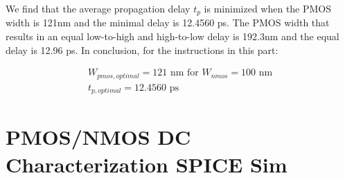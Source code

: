 \documentclass[11pt]{article}
\begin{document}
We find that the average propagation delay $t_p$ is minimized when the PMOS width is 121nm and the minimal delay is 12.4560 ps. The PMOS width that results in an equal low-to-high and high-to-low delay is 192.3nm and the equal delay is 12.96 ps. In conclusion, for the instructions in this part:

\begin{eqnarray}
W_{pmos,optimal} = 121 \text{ nm for } W_{nmos} = 100 \text{ nm} \nonumber \\
t_{p,optimal} = 12.4560 \text{ ps} \nonumber
\end{eqnarray}

\newpage
\appendix
\section{PMOS/NMOS DC Characterization SPICE Sim} \label{dc_characterization_spice}
\end{document}

